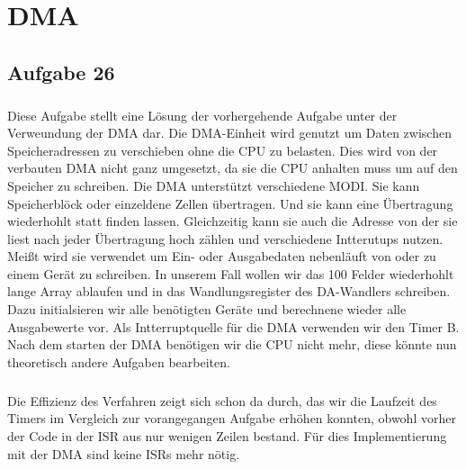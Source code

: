 \chapter{DMA}

\section*{Aufgabe 26}

\paragraph*{}
Diese Aufgabe stellt eine Lösung der vorhergehende Aufgabe unter der Verweundung der DMA dar. Die DMA-Einheit wird genutzt um Daten zwischen Speicheradressen zu verschieben ohne die CPU zu belasten. Dies wird von der verbauten DMA nicht ganz umgesetzt, da sie die CPU anhalten muss um auf den Speicher zu schreiben. Die DMA unterstützt verschiedene MODI. Sie kann Speicherblöck oder einzeldene Zellen übertragen. Und sie kann eine Übertragung wiederhohlt statt finden lassen. Gleichzeitig kann sie auch die Adresse von der sie liest nach jeder Übertragung hoch zählen und verschiedene Intterutups nutzen. Meißt wird sie verwendet um Ein- oder Ausgabedaten nebenläuft von oder zu einem Gerät zu schreiben. In unserem Fall wollen wir das 100 Felder wiederhohlt lange Array ablaufen und in das Wandlungsregister des DA-Wandlers schreiben. Dazu initialsieren wir alle benötigten Geräte und berechnene wieder alle Ausgabewerte vor. Als Intterruptquelle für die DMA verwenden wir den Timer B. Nach dem starten der DMA benötigen wir die CPU nicht mehr, diese könnte nun theoretisch andere Aufgaben bearbeiten.  




\paragraph*{}
Die Effizienz des Verfahren zeigt sich schon da durch, das wir die Laufzeit des Timers im Vergleich zur vorangegangen Aufgabe erhöhen konnten, obwohl vorher der Code in der ISR aus nur wenigen Zeilen bestand. Für dies Implementierung mit der DMA sind keine ISRs mehr nötig.
